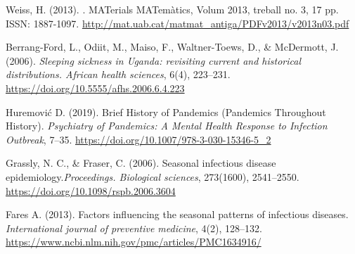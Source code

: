 	\newpage
	\begin{thebibliography}{5}
        Weiss, H. (2013). . MATerials MATemàtics, Volum 2013, treball no. 3, 17 pp. ISSN: 1887-1097. \url{http://mat.uab.cat/matmat_antiga/PDFv2013/v2013n03.pdf}
        
        Berrang-Ford, L., Odiit, M., Maiso, F., Waltner-Toews, D., & McDermott, J. (2006). \textit{Sleeping sickness in Uganda: revisiting current and historical distributions. African health sciences}, 6(4), 223–231.
        \url{https://doi.org/10.5555/afhs.2006.6.4.223}
        
        Huremović D. (2019). Brief History of Pandemics (Pandemics Throughout History). \textit{Psychiatry of Pandemics: A Mental Health Response to Infection Outbreak}, 7–35.
        \url{https://doi.org/10.1007/978-3-030-15346-5_2 }
        
        Grassly, N. C., & Fraser, C. (2006). Seasonal infectious disease epidemiology.\textit{Proceedings. Biological sciences}, 273(1600), 2541–2550.
        \url{https://doi.org/10.1098/rspb.2006.3604}
        
        Fares A. (2013). Factors influencing the seasonal patterns of infectious diseases. \textit{International journal of preventive medicine}, 4(2), 128–132.
        \url{https://www.ncbi.nlm.nih.gov/pmc/articles/PMC1634916/}
	\end{thebibliography}
	
 